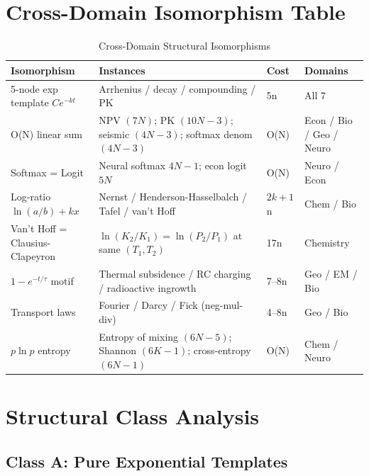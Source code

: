 \documentclass[12pt,a4paper]{article}
\theoremstyle{definition}
\begin{document}
\section{Cross-Domain Isomorphism Table}
\label{sec:isomorphisms}

\begin{table}[ht]
\centering
\caption{Cross-Domain Structural Isomorphisms}
\label{tab:iso}
\begin{tabular}{L{2.4cm} L{5.6cm} C{1.0cm} L{2.8cm}}
\toprule
\textbf{Isomorphism} & \textbf{Instances} & \textbf{Cost} & \textbf{Domains} \\
-node exp template $Ce^{-kt}$ &
  Arrhenius / decay / compounding / PK &
  5n &
  All 7 \\
\addlinespace
O(N) linear sum &
  NPV $(7N)$; PK $(10N{-}3)$; seismic $(4N{-}3)$; softmax denom $(4N{-}3)$ &
  O(N) &
  Econ / Bio / Geo / Neuro \\
\addlinespace
Softmax = Logit &
  Neural softmax $4N{-}1$; econ logit $5N$ &
  O(N) &
  Neuro / Econ \\
\addlinespace
Log-ratio $\ln(a/b)+kx$ &
  Nernst / Henderson-Hasselbalch / Tafel / van't Hoff &
  $2k{+}1$n &
  Chem / Bio \\
\addlinespace
Van't Hoff = Clausius-Clapeyron &
  $\ln(K_2/K_1) = \ln(P_2/P_1)$ at same $(T_1,T_2)$ &
  17n &
  Chemistry \\
\addlinespace
$1{-}e^{-t/\tau}$ motif &
  Thermal subsidence / RC charging / radioactive ingrowth &
  7--8n &
  Geo / EM / Bio \\
\addlinespace
Transport laws &
  Fourier / Darcy / Fick (neg-mul-div) &
  4--8n &
  Geo / Bio \\
\addlinespace
$p\ln p$ entropy &
  Entropy of mixing $(6N{-}5)$; Shannon $(6K{-}1)$; cross-entropy $(6N{-}1)$ &
  O(N) &
  Chem / Neuro \\
\bottomrule
\end{tabular}
\end{table}

\section{Structural Class Analysis}
\label{sec:classes}

\subsection{Class A: Pure Exponential Templates}
\end{document}
